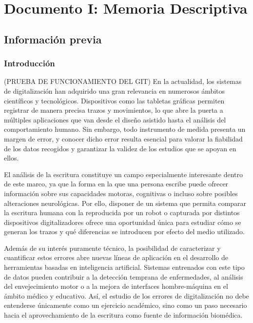 \documentclass[12pt,a4paper,oneside]{report}
\begin{document}
\tableofcontents
\clearpage
\listoffigures
\clearpage
\listoftables
\clearpage
{}

\chapter{Documento I: Memoria Descriptiva}
\clearpage

\section{Información previa}\label{sec:info-previa}

\subsection{Introducción}


(PRUEBA DE FUNCIONAMIENTO DEL GIT) En la actualidad, los sistemas de digitalización han adquirido una gran relevancia en numerosos ámbitos científicos y tecnológicos. 
Dispositivos como las tabletas gráficas permiten registrar de manera precisa trazos y movimientos, lo que abre la puerta a múltiples 
aplicaciones que van desde el diseño asistido hasta el análisis del comportamiento humano. Sin embargo, todo instrumento de medida 
presenta un margen de error, y conocer dicho error resulta esencial para valorar la fiabilidad de los datos recogidos y garantizar 
la validez de los estudios que se apoyan en ellos.  

El análisis de la escritura constituye un campo especialmente interesante dentro de este marco, ya que la forma en la que una persona 
escribe puede ofrecer información sobre sus capacidades motoras, cognitivas o incluso sobre posibles alteraciones neurológicas. 
Por ello, disponer de un sistema que permita comparar la escritura humana con la reproducida por un robot o capturada por distintos 
dispositivos digitalizadores ofrece una oportunidad única para estudiar cómo se generan los trazos y qué diferencias se introducen 
por efecto del medio utilizado.  

Además de su interés puramente técnico, la posibilidad de caracterizar y cuantificar estos errores abre nuevas líneas de aplicación 
en el desarrollo de herramientas basadas en inteligencia artificial. Sistemas entrenados con este tipo de datos pueden contribuir 
a la detección temprana de enfermedades, al análisis del envejecimiento motor o a la mejora de interfaces hombre-máquina en el ámbito 
médico y educativo. Así, el estudio de los errores de digitalización no debe entenderse únicamente como un ejercicio académico, 
sino como un paso necesario hacia el aprovechamiento de la escritura como fuente de información biomédica.  
\end{document}
